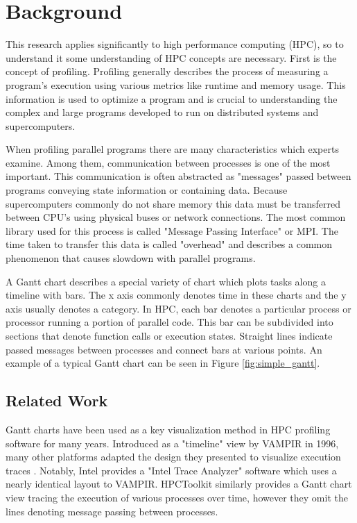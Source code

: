 \section{Background}
\label{sec:background}

This research applies significantly to high performance computing (HPC), so to understand it some understanding of HPC concepts are necessary. First is the concept of profiling. Profiling generally describes the process of measuring a program's execution using various metrics like runtime and memory usage. This information is used to optimize a program and is crucial to understanding the complex and large programs developed to run on distributed systems and supercomputers.

When profiling parallel programs there are many characteristics which experts examine. Among them, communication between processes is one of the most important. This communication is often abstracted as "messages" passed between programs conveying state information or containing data. Because supercomputers commonly do not share memory this data must be transferred between CPU's using physical buses or network connections. The most common library used for this process is called "Message Passing Interface" or MPI. The time taken to transfer this data is called "overhead" and describes a common phenomenon that causes slowdown with parallel programs.


A Gantt chart describes a special variety of chart which plots tasks along a timeline with bars. The x axis commonly denotes time in these charts and the y axis usually denotes a category. In HPC, each bar denotes a particular process or processor running a portion of parallel code. This bar can be subdivided into sections that denote function calls or execution states. Straight lines indicate passed messages between processes and connect bars at various points. An example of a typical Gantt chart can be seen in Figure \ref{fig:simple_gantt}.


\subsection{Related Work}
\label{sec:related}
Gantt charts have been used as a key visualization method in HPC profiling software for many years. Introduced as a "timeline" view by VAMPIR in 1996, many other platforms adapted the design they presented to visualize execution traces \cite{nagel1996vampir}.  Notably, Intel provides a "Intel Trace Analyzer" software which uses a nearly identical layout to VAMPIR\cite{Intel2019}. HPCToolkit similarly provides a Gantt chart view tracing the execution of various processes over time, however they omit the lines denoting message passing between processes\cite{Adhianto2009}.

